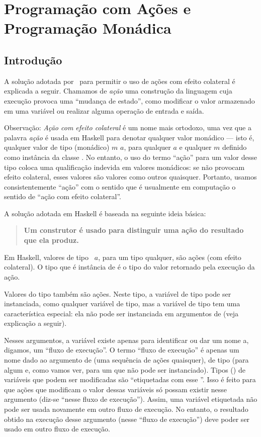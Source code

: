 \chapter{Programação com Ações e Programação Monádica}
\label{Monadas}

\section{Introdução}

A solução adotada por \Haskell\ para permitir o uso de ações com
efeito colateral é explicada a seguir. Chamamos de {\em ação\/} uma
construção da linguagem cuja execução provoca uma ``mudança de
estado'', como modificar o valor armazenado em uma variável ou
realizar alguma operação de entrada e saída.

Observação: {\em Ação com efeito colateral\/} é um nome mais ortodoxo,
uma vez que a palavra {\em ação\/} é usada em Haskell para denotar
qualquer valor monádico --- isto é, qualquer valor de tipo (monádico)
$m$ $a$, para qualquer $a$ e qualquer $m$ definido como instância da
classe . No entanto, o uso do termo ``ação'' para um valor
desse tipo coloca uma qualificação indevida em valores monádicos: se
não provocam efeito colateral, esses valores são valores como outros
quaisquer. Portanto, usamos consistentemente ``ação'' com o sentido
que é usualmente em computação o sentido de ``ação com efeito
colateral''.

A solução adotada em Haskell é baseada na seguinte ideia básica:

  \begin{quotation}
     {\bf Um construtor é usado para distinguir uma ação do resultado
       que ela produz.}
  \end{quotation}

Em Haskell, valores de tipo {\tt \IO\ $a$}, para um tipo 
qualquer, s\~ao a\c{c}\~oes (com efeito colateral). O tipo que é
instância de  é o tipo do valor retornado pela execução da
ação.

Valores do tipo  também são ações. Neste tipo, a variável
de tipo  pode ser instanciada, como qualquer variável de tipo,
mas a variável de tipo  tem uma característica especial: ela
não pode ser instanciada em argumentos de  (veja explicação
a seguir).

Nesses argumentos, a variável  existe apenas para identificar
ou dar um nome a, digamos, um ``fluxo de execução''. O termo ``fluxo
de execução'' é apenas um nome dado ao argumento de  (uma
sequência de ações quaisquer), de tipo  (para algum
 e, como vamos ver, para um  que não pode ser
instanciado). Tipos () de variáveis que podem ser
modificadas são ``etiquetadas com esse ''. Isso é feito para
que ações que modificam o valor dessas variáveis só possam existir
nesse argumento (diz-se ``nesse fluxo de execução''). Assim, uma
variável etiquetada não pode ser usada novamente em outro fluxo de
execução. No entanto, o resultado obtido na execução desse argumento
(nesse ``fluxo de execução'') deve poder ser usado em outro fluxo de
execução.

